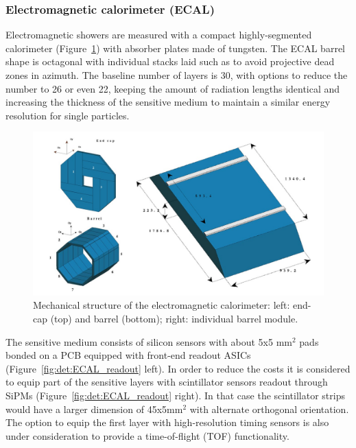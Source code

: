 \subsubsection*{Electromagnetic calorimeter (ECAL)}

Electromagnetic showers are measured with a compact highly-segmented calorimeter (Figure~\ref{fig:det:ECAL}) with absorber plates made of tungsten. The ECAL barrel shape is octagonal with individual stacks laid such as to avoid projective dead zones in azimuth. The baseline number of layers is 30, with options to reduce the number to 26 or even 22, keeping the amount of radiation lengths identical and increasing the thickness of the sensitive medium to maintain a similar energy resolution for single particles. 

\begin{figure}[t!]
\centering
\includegraphics[width=1.0\hsize]{Detector/fig/ECAL_structure.jpg}
\caption{Mechanical structure of the electromagnetic calorimeter: left: end-cap (top) and barrel (bottom); right: individual barrel module.}
\label{fig:det:ECAL}
\end{figure}

The sensitive medium consists of silicon sensors with about 5x5 mm$^2$ pads bonded on a PCB equipped with front-end readout ASICs (Figure~\ref{fig:det:ECAL_readout} left). In order to reduce the costs it is considered to equip part of the sensitive layers with scintillator sensors readout through SiPMs (Figure~\ref{fig:det:ECAL_readout} right). In that case the scintillator strips would have a larger dimension of 45x5mm$^2$ with alternate orthogonal orientation. The option to equip the first layer with high-resolution timing sensors is also under consideration to provide a time-of-flight (TOF) functionality.

